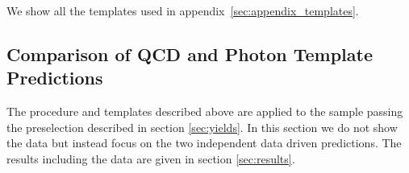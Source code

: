 We show all the templates used in appendix~\ref{sec:appendix_templates}.

%
%





\subsection{Comparison of QCD and Photon Template Predictions}
\label{sec:tempcompresults}

The procedure and templates described above are applied to the \Z sample passing the preselection 
described in section \ref{sec:yields}. In this section we do not show the \Z data but instead 
focus on the two independent data driven predictions. The results including the \Z data are given 
in section \ref{sec:results}.


